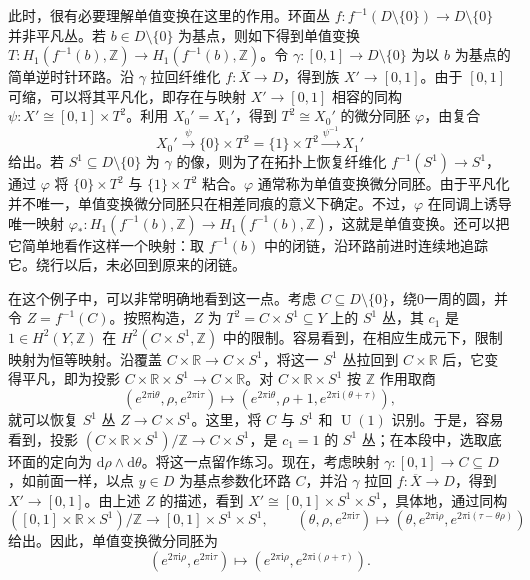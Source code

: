 \begin{construction}
此时，很有必要理解单值变换在这里的作用。环面丛 $f\colon f^{-1}(D\setminus\{0\})\to D\setminus\{0\}$ 并非平凡丛。若 $b\in D\setminus\{0\}$ 为基点，则如下得到单值变换 $T\colon H_1(f^{-1}(b),\mathbb Z)\to H_1(f^{-1}(b),\mathbb Z)$。令 $\gamma\colon[0,1]\to D\setminus\{0\}$ 为以 $b$ 为基点的简单逆时针环路。沿 $\gamma$ 拉回纤维化 $f\colon\overline X\to D$，得到族 $X'\to[0,1]$。由于 $[0,1]$ 可缩，可以将其平凡化，即存在与映射 $X'\to[0,1]$ 相容的同构 $\psi\colon X'\cong[0,1]\times T^2$。利用 $X_0'=X_1'$，得到 $T^2\cong X_0'$ 的微分同胚 $\varphi$，由复合
\[
X_0'\xrightarrow{\psi}\{0\}\times T^2
=\{1\}\times T^2\xrightarrow{\psi^{-1}}X_1'
\]
给出。若 $S^1\subseteq D\setminus\{0\}$ 为 $\gamma$ 的像，则为了在拓扑上恢复纤维化 $f^{-1}(S^1)\to S^1$，通过 $\varphi$ 将 $\{0\}\times T^2$ 与 $\{1\}\times T^2$ 粘合。$\varphi$ 通常称为单值变换微分同胚。由于平凡化并不唯一，单值变换微分同胚只在相差同痕的意义下确定。不过，$\varphi$ 在同调上诱导唯一映射 $\varphi_*\colon H_1(f^{-1}(b),\mathbb Z)\to H_1(f^{-1}(b),\mathbb Z)$，这就是单值变换。还可以把它简单地看作这样一个映射：取 $f^{-1}(b)$ 中的闭链，沿环路前进时连续地追踪它。绕行以后，未必回到原来的闭链。

在这个例子中，可以非常明确地看到这一点。考虑 $C\subseteq D\setminus\{0\}$，绕0一周的圆，并令 $Z=f^{-1}(C)$。按照构造，$Z$ 为 $T^2=C\times S^1\subseteq Y$ 上的 $S^1$ 丛，其 $c_1$ 是 $1\in H^2(Y,\mathbb Z)$ 在 $H^2(C\times S^1,\mathbb Z)$ 中的限制。容易看到，在相应生成元下，限制映射为恒等映射。沿覆盖 $C\times\mathbb R\to C\times S^1$，将这一 $S^1$ 丛拉回到 $C\times\mathbb R$ 后，它变得平凡，即为投影 $C\times\mathbb R\times S^1\to C\times\mathbb R$。对 $C\times\mathbb R\times S^1$ 按 $\mathbb Z$ 作用取商
\[
(e^{2\pi\mathrm i\theta},\rho,e^{2\pi\mathrm i\tau})
\longmapsto(e^{2\pi\mathrm i\theta},\rho+1,e^{2\pi\mathrm i(\theta+\tau)}),
\]
就可以恢复 $S^1$ 丛 $Z\to C\times S^1$。这里，将 $C$ 与 $S^1$ 和 $\operatorname{U}(1)$ 识别。于是，容易看到，投影 $(C\times\mathbb R\times S^1)/\mathbb Z\to C\times S^1$，是 $c_1=1$ 的 $S^1$ 丛；在本段中，选取底环面的定向为 $\mathrm d\rho\wedge\mathrm d\theta$。将这一点留作练习。现在，考虑映射 $\gamma\colon[0,1]\to C\subseteq D$，如前面一样，以点 $y\in D$ 为基点参数化环路 $C$，并沿 $\gamma$ 拉回 $f\colon\overline X\to D$，得到 $X'\to[0,1]$。由上述 $Z$ 的描述，看到 $X'\cong[0,1]\times S^1\times S^1$，具体地，通过同构
\[
([0,1]\times\mathbb R\times S^1)/\mathbb Z
\longrightarrow[0,1]\times S^1\times S^1,
\qquad
(\theta,\rho,e^{2\pi\mathrm i\tau})
\longmapsto(\theta,e^{2\pi\mathrm i\rho},e^{2\pi\mathrm i(\tau-\theta\rho)})
\]
给出。因此，单值变换微分同胚为
\[
(e^{2\pi\mathrm i\rho},e^{2\pi\mathrm i\tau})
\longmapsto(e^{2\pi\mathrm i\rho},e^{2\pi\mathrm i(\rho+\tau)}).
\]


\end{construction}
